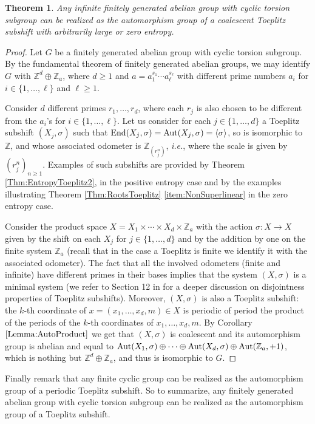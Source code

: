 \documentclass{daj}
\theoremstyle{plain}
\newtheorem{theorem}{Theorem}[section]
\theoremstyle{definition}
\begin{document}
\begin{theorem}\label{theo:anycountable}
	Any infinite finitely generated abelian group with cyclic torsion subgroup can be realized as the automorphism group of a coalescent Toeplitz subshift with arbitrarily large or zero entropy.
\end{theorem}
\begin{proof}
	Let $G$ be a finitely generated abelian group with cyclic torsion subgroup.
	By the fundamental theorem of finitely generated abelian groups, we may identify $G$ with 
	$\mathbb{Z}^{d}\oplus \mathbb{Z}_{a}$, where $d\geq 1$ and $a=a_1^{s_1}\cdots a_{\ell}^{s_\ell}$ with different prime numbers $a_i$ for $i\in \{1,\ldots,\ell\}$ and $\ell\geq 1$. 
	
	Consider $d$ different primes $r_1,\ldots,r_d$, where each $r_j$ is also chosen to be different from the $a_i$'s for $i\in \{1,\ldots,\ell\}$. 
	Let us consider for each $j\in \{1,\ldots,d\}$  a Toeplitz subshift $(X_j,\sigma)$ such that
	${\rm End}(X_j,\sigma)={\rm Aut}(X_j,\sigma)=\langle \sigma \rangle$, so is isomorphic to $\mathbb{Z}$, and whose associated odometer is $\mathbb{Z}_{(r_j^n)}$, {\em i.e.}, where the scale is given by $(r_j^n)_{n\geq 1}$.   
	Examples of such subshifts are provided by Theorem \ref{Thm:EntropyToeplitz2}, in the positive entropy case and by the examples illustrating  Theorem \ref{Thm:RootsToeplitz} \eqref{item:NonSuperlinear} in the zero entropy case.
	
	
	Consider the product space $X=X_1\times \cdots \times  X_d \times \mathbb{Z}_{a}$ with the action $\sigma\colon X\to X$  given by the shift on each $X_j$ for $j\in \{1,\ldots,d\}$ and by the addition by one on the finite system $\mathbb{Z}_{a}$ (recall that in the case a Toeplitz is finite we identify it with the associated odometer). The fact that all the involved odometers (finite and infinite) have different primes in their bases implies that the system $(X,\sigma)$ is a minimal system (we refer to Section 12 in \cite{Downarowicz:2005} for a deeper discussion on disjointness properties of Toeplitz subshifts). Moreover, $(X,\sigma)$ is also a Toeplitz subshift: the $k$-th coordinate of $x=(x_1,\ldots,x_d,m) \in X$ is periodic of period the product of the periods of the $k$-th coordinates of $x_1,\ldots, x_d, m$.  
	By Corollary $\ref{Lemma:AutoProduct}$ we get that $(X,\sigma)$ is coalescent and its automorphism group is abelian and equal to ${\rm Aut}(X_1,\sigma)\oplus\cdots \oplus {\rm Aut}(X_d,\sigma) \oplus {\rm Aut}(\mathbb{Z}_{a},+1)$,
	which is nothing but $\mathbb{Z}^{d} \oplus \mathbb{Z}_{a}$, and thus is isomorphic to $G$.    	
\end{proof}
Finally remark that any finite cyclic group  can be realized as the automorphism  group of a periodic Toeplitz subshift. So to summarize,  any finitely generated abelian group with cyclic torsion subgroup can be realized as the automorphism  group of a Toeplitz subshift.
\end{document}
